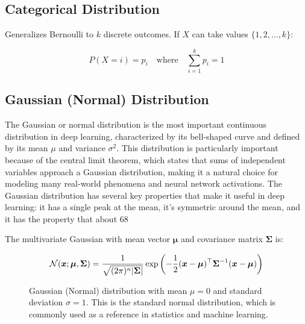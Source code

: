 \subsection{Categorical Distribution}

Generalizes Bernoulli to $k$ discrete outcomes. If $X$ can take values $\{1, 2, \ldots, k\}$:

\begin{equation}
P(X=i) = p_i \quad \text{where} \quad \sum_{i=1}^{k} p_i = 1
\end{equation}

\subsection{Gaussian (Normal) Distribution}

The Gaussian or normal distribution is the most important continuous distribution in deep learning, characterized by its bell-shaped curve and defined by its mean $\mu$ and variance $\sigma^2$. This distribution is particularly important because of the central limit theorem, which states that sums of independent variables approach a Gaussian distribution, making it a natural choice for modeling many real-world phenomena and neural network activations. The Gaussian distribution has several key properties that make it useful in deep learning: it has a single peak at the mean, it's symmetric around the mean, and it has the property that about 68%

The multivariate Gaussian with mean vector $\boldsymbol{\mu}$ and covariance matrix $\boldsymbol{\Sigma}$ is:

\begin{equation}
\mathcal{N}(\boldsymbol{x}; \boldsymbol{\mu}, \boldsymbol{\Sigma}) = \frac{1}{\sqrt{(2\pi)^n |\boldsymbol{\Sigma}|}} \exp\left(-\frac{1}{2}(\boldsymbol{x}-\boldsymbol{\mu})^\top \boldsymbol{\Sigma}^{-1} (\boldsymbol{x}-\boldsymbol{\mu})\right)
\end{equation}

\begin{figure}[h]
\centering
{}
\caption{Gaussian (Normal) distribution with mean $\mu = 0$ and standard deviation $\sigma = 1$. This is the standard normal distribution, which is commonly used as a reference in statistics and machine learning.}
\label{fig:gaussian-distribution}
\end{figure}

